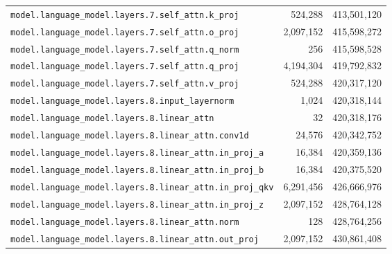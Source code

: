 \documentclass[10pt,a4paper]{article}
\theoremstyle{definition}
\begin{document}
\begin{appendices}
\begin{longtable}{p{9.5cm}rr}
\texttt{model.\allowbreak{}language\_model.\allowbreak{}layers.\allowbreak{}7.\allowbreak{}self\_attn.\allowbreak{}k\_proj} & 524,288 & 413,501,120 \\
\texttt{model.\allowbreak{}language\_model.\allowbreak{}layers.\allowbreak{}7.\allowbreak{}self\_attn.\allowbreak{}o\_proj} & 2,097,152 & 415,598,272 \\
\texttt{model.\allowbreak{}language\_model.\allowbreak{}layers.\allowbreak{}7.\allowbreak{}self\_attn.\allowbreak{}q\_norm} & 256 & 415,598,528 \\
\texttt{model.\allowbreak{}language\_model.\allowbreak{}layers.\allowbreak{}7.\allowbreak{}self\_attn.\allowbreak{}q\_proj} & 4,194,304 & 419,792,832 \\
\texttt{model.\allowbreak{}language\_model.\allowbreak{}layers.\allowbreak{}7.\allowbreak{}self\_attn.\allowbreak{}v\_proj} & 524,288 & 420,317,120 \\
\texttt{model.\allowbreak{}language\_model.\allowbreak{}layers.\allowbreak{}8.\allowbreak{}input\_layernorm} & 1,024 & 420,318,144 \\
\texttt{model.\allowbreak{}language\_model.\allowbreak{}layers.\allowbreak{}8.\allowbreak{}linear\_attn} & 32 & 420,318,176 \\
\texttt{model.\allowbreak{}language\_model.\allowbreak{}layers.\allowbreak{}8.\allowbreak{}linear\_attn.\allowbreak{}conv1d} & 24,576 & 420,342,752 \\
\texttt{model.\allowbreak{}language\_model.\allowbreak{}layers.\allowbreak{}8.\allowbreak{}linear\_attn.\allowbreak{}in\_proj\_a} & 16,384 & 420,359,136 \\
\texttt{model.\allowbreak{}language\_model.\allowbreak{}layers.\allowbreak{}8.\allowbreak{}linear\_attn.\allowbreak{}in\_proj\_b} & 16,384 & 420,375,520 \\
\texttt{model.\allowbreak{}language\_model.\allowbreak{}layers.\allowbreak{}8.\allowbreak{}linear\_attn.\allowbreak{}in\_proj\_qkv} & 6,291,456 & 426,666,976 \\
\texttt{model.\allowbreak{}language\_model.\allowbreak{}layers.\allowbreak{}8.\allowbreak{}linear\_attn.\allowbreak{}in\_proj\_z} & 2,097,152 & 428,764,128 \\
\texttt{model.\allowbreak{}language\_model.\allowbreak{}layers.\allowbreak{}8.\allowbreak{}linear\_attn.\allowbreak{}norm} & 128 & 428,764,256 \\
\texttt{model.\allowbreak{}language\_model.\allowbreak{}layers.\allowbreak{}8.\allowbreak{}linear\_attn.\allowbreak{}out\_proj} & 2,097,152 & 430,861,408 \\

\end{longtable}
\end{appendices}
\end{document}
